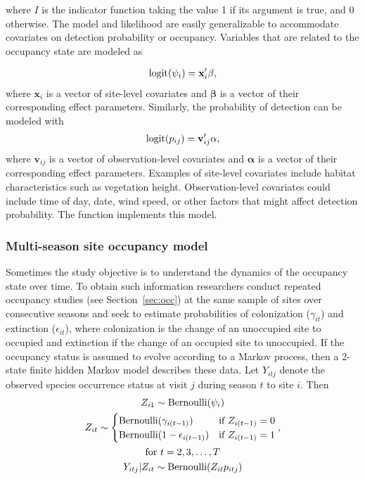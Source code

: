 \documentclass[article,shortnames]{jss}
\DeclareMathOperator{\logit}{logit}
\DeclareMathOperator{\Bern}{Bernoulli}
\begin{document}
where $I$ is the indicator function taking the value 1 if its argument is 
true, and 0 otherwise. The model and likelihood are easily generalizable to 
accommodate covariates on detection probability or occupancy.
Variables that are related to the occupancy state are modeled as

\begin{gather}
  \logit(\psi_i) = \mathbf x_i' \mathbf \beta, \notag
\end{gather}
where $\mathbf x_i$ is a vector of site-level covariates and $\mathbf \beta$
is a vector of their corresponding effect parameters.  Similarly, the
probability of detection can be modeled with
\begin{gather}
  \logit(p_{ij}) = \mathbf v_{ij}' \mathbf \alpha, \notag
\end{gather}
where $\mathbf v_{ij}$ is a vector of observation-level covariates and
$\mathbf \alpha$ is a vector of their corresponding effect parameters.  
Examples of site-level covariates include habitat characteristics such as 
vegetation height. Observation-level covariates could include time of day, 
date, wind speed, or other factors that might affect detection probability. 
The function  implements this model.


\subsubsection{Multi-season site occupancy model} 

Sometimes the study objective is to understand the dynamics of the 
occupancy state over time. To obtain such information researchers conduct 
repeated occupancy studies (see Section~\ref{sec:occ}) at the same sample of 
sites over consecutive seasons \citep{MacKenzie2003} and seek to estimate
probabilities of colonization ($\gamma_{it}$) and extinction
($\epsilon_{it}$), where colonization is the change of an unoccupied
site to occupied and extinction if the change of an occupied site to
unoccupied.  If the occupancy status is assumed to evolve according to
a Markov process, then a 2-state finite hidden Markov model describes
these data.  Let $Y_{itj}$ denote the observed species occurrence
status at visit $j$ during season $t$ to site $i$.  Then
\begin{gather}
  Z_{i1} \sim \Bern(\psi_i) \notag \\
  Z_{it} \sim
  \begin{cases}
    \Bern(\gamma_{i(t-1)}) & \text{if $Z_{i(t-1)} = 0$} \notag \\
    \Bern(1-\epsilon_{i(t-1)}) & \text{if $Z_{i(t-1)} = 1$}
  \end{cases}, \\
  \text{for $t=2,3,\dots,T$} \notag \\
  Y_{itj} | Z_{it} \sim \Bern(Z_{it} p_{itj}) \notag
\end{gather}
\end{document}
